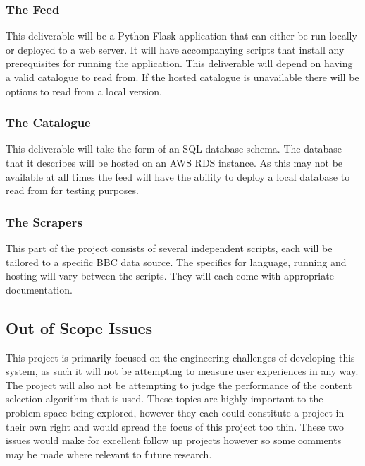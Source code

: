 \documentclass[12pt,titlepage]{article}
\begin{document}
    \subsubsection{The Feed}

    This deliverable will be a Python Flask application that can either be run
    locally or deployed to a web server. It will have accompanying scripts that
    install any prerequisites for running the application. This deliverable
    will depend on having a valid catalogue to read from. If the hosted
    catalogue is unavailable there will be options to read from a local version.

    \subsubsection{The Catalogue}

    This deliverable will take the form of an SQL database schema. The database
    that it describes will be hosted on an AWS RDS instance. As this may not be
    available at all times the feed will have the ability to deploy a local
    database to read from for testing purposes.

    \subsubsection{The Scrapers}

    This part of the project consists of several independent scripts, each will
    be tailored to a specific BBC data source. The specifics for language,
    running and hosting will vary between the scripts. They will each come with
    appropriate documentation.

  \subsection{Out of Scope Issues}

  This project is primarily focused on the engineering challenges of developing
  this system, as such it will not be attempting to measure user experiences in
  any way. The project will also not be attempting to judge the performance of
  the content selection algorithm that is used. These topics are highly
  important to the problem space being explored, however they each could
  constitute a project in their own right and would spread the focus of this
  project too thin. These two issues would make for excellent follow up projects
  however so some comments may be made where relevant to future research.
\end{document}
